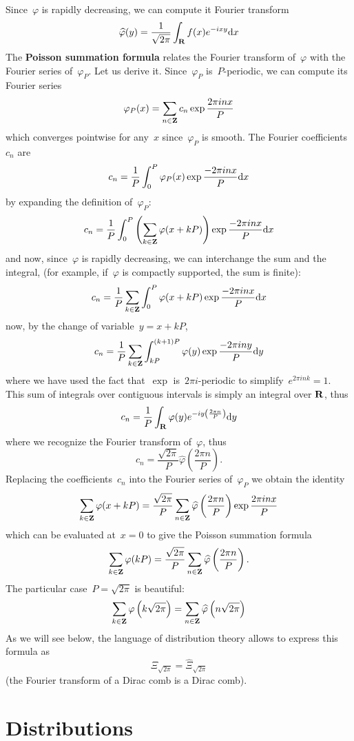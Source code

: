 Since~$\varphi$ is rapidly decreasing, we can compute it Fourier
transform
$$
\widehat\varphi(y)=\frac{1}{\sqrt{2\pi}}\int_{\mathbf{R}} f(x)e^{-ixy}\mathrm{d} x
$$
The {\bf Poisson summation formula} relates the Fourier transform
of~$\varphi$ with the Fourier series of~$\varphi_P$.  Let us derive
it.  Since~$\varphi_P$ is~$P$-periodic, we can compute its Fourier
series
$$
\varphi_P(x)=\sum_{n\in\mathbf{Z}}c_n\exp\frac{2\pi inx}{P}
$$
which converges pointwise for any~$x$ since~$\varphi_P$ is smooth.
The Fourier coefficients~$c_n$ are
$$
c_n = \frac{1}{P}\int_0^P\varphi_P(x)\exp\frac{-2\pi inx}{P}\mathrm{d} x
$$
by expanding the definition of~$\varphi_P$:
$$
c_n = \frac{1}{P}\int_0^P\left(\sum_{k\in\mathbf{Z}}\varphi(x+kP)\right)\exp\frac{-2\pi inx}{P}\mathrm{d} x
$$
and now, since~$\varphi$ is rapidly decreasing, we can interchange
the sum and the integral, (for example, if~$\varphi$ is compactly
supported, the sum is finite):
$$
c_n = \frac{1}{P}\sum_{k\in\mathbf{Z}}\int_0^P\varphi(x+kP)\exp\frac{-2\pi inx}{P}\mathrm{d} x
$$
now, by the change of variable~$y=x+kP$,
$$
c_n =
\frac{1}{P}\sum_{k\in\mathbf{Z}}\int_{kP}^{(k+1)P}\varphi(y)\exp\frac{-2\pi
iny}{P}\mathrm{d} y
$$
where we have used the fact that~$\exp$ is~$2\pi i$-periodic to
simplify~$e^{2\pi ink}=1$.  This sum of integrals over contiguous
intervals is simply an integral over $\mathbf{R}$, thus
$$
c_n =
\frac{1}{P}\int_{\mathbf{R}}\varphi(y)e^{-iy\left(\frac{2\pi n}{P}\right)}\mathrm{d} y
$$
where we recognize the Fourier transform of~$\varphi$, thus
$$
c_n =\frac{\sqrt{2\pi}}{P}\widehat\varphi\left(
\frac{2\pi n}{P}
\right).
$$
Replacing the coefficients~$c_n$ into the Fourier series
of~$\varphi_P$ we obtain the identity
$$
\sum_{k\in\mathbf{Z}}\varphi(x+kP)
=
\frac{\sqrt{2\pi}}{P}
\sum_{n\in\mathbf{Z}}
\widehat\varphi\left(
\frac{2\pi n}{P}
\right)
\exp\frac{2\pi inx}{P}
$$
which can be evaluated at~$x=0$ to give the Poisson summation formula
$$
\sum_{k\in\mathbf{Z}}\varphi(kP)
=
\frac{\sqrt{2\pi}}{P}
\sum_{n\in\mathbf{Z}}
\widehat\varphi\left(
\frac{2\pi n}{P}
\right).
$$
The particular case~$P=\sqrt{2\pi}$ is beautiful:
$$
\sum_{k\in\mathbf{Z}}\varphi\left(k\sqrt{2\pi}\right)
=
\sum_{n\in\mathbf{Z}}\widehat\varphi\left(n\sqrt{2\pi}\right)
$$
As we will see below, the language of distribution theory allows to
express this formula
as $$\Xi_{\sqrt{2\pi}}=\widehat\Xi_{\sqrt{2\pi}}$$ (the Fourier transform of a
Dirac comb is a Dirac comb).





\section{Distributions}

